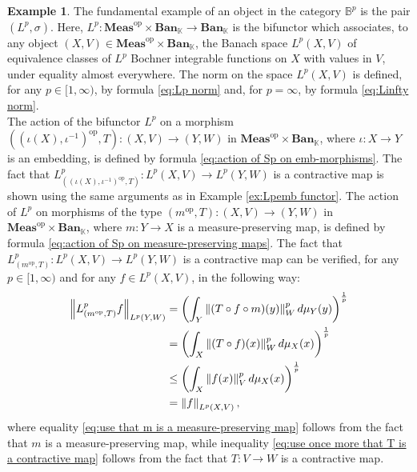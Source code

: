 \documentclass{amsart}
\theoremstyle{definition}
\newtheorem{example}[definition]{Example}
\theoremstyle{plain}
\newcommand{\norm}[1]{\left\lVert #1\right\rVert} %
\newcommand{\opMeas}{\mathbf{Meas}^\mathrm{op}}
\newcommand{\Ban}{\mathbf{Ban}_{\mathbb{K}}}
\newcommand{\Bp}{\mathbb{B}^p}
\begin{document}
        \begin{example}
        \label{ex:Lp functor}
            The fundamental example of an object in the category $\Bp$ is the pair $(L^p,\sigma)$.
            Here, $L^p \colon \opMeas \times \Ban \rightarrow \Ban$ is the bifunctor which associates, to any object $(X,V) \in \opMeas \times \Ban$, the Banach space $L^p(X,V)$ of equivalence classes of $L^p$ Bochner integrable functions on $X$ with values in $V$, under equality almost everywhere. 
            The norm on the space $L^p(X,V)$ is defined, for any $p \in [1,\infty)$, by formula \eqref{eq:Lp norm} and, for $p = \infty$, by formula \eqref{eq:Linfty norm}. \\
            The action of the bifunctor $L^p$ on a morphism $\left( \left( \iota(X),\iota^{-1} \right)^{\mathrm{op}},T \right) \colon (X,V) \rightarrow (Y,W)$ in $\opMeas \times \Ban$, where $\iota \colon X \rightarrow Y$ is an embedding, is defined by formula \eqref{eq:action of Sp on emb-morphisms}.
            The fact that $L^p_{\left( \left( \iota(X),\iota^{-1} \right)^{\mathrm{op}},T \right)} \colon L^p(X,V) \rightarrow L^p(Y,W)$ is a contractive map is shown using the same arguments as in Example \ref{ex:Lpemb functor}.
            The action of $L^p$ on morphisms of the type $\left( m^{\mathrm{op}},T \right) \colon (X,V) \rightarrow (Y,W)$ in $\opMeas \times \Ban$, where $m \colon Y \rightarrow X$ is a measure-preserving map, is defined by formula \eqref{eq:action of Sp on measure-preserving maps}.
            The fact that $L^p_{\left( m^{\mathrm{op}},T \right)} \colon L^p(X,V) \rightarrow L^p(Y,W)$ is a contractive map can be verified, for any $p \in [1,\infty)$ and for any $f \in L^p(X,V)$, in the following way:
            \begin{align}
                \norm{L^p_{\left( m^{\mathrm{op}},T \right)} f}_{L^p(Y,W)} &= \left( \int_{Y} \norm{(T \circ f \circ m)(y)}_W^p d\mu_{Y}(y) \right)^{\frac{1}{p}} \notag \\
                &= \left( \int_{X} \norm{(T \circ f)(x)}_W^p d\mu_{X}(x) \right)^{\frac{1}{p}} \label{eq:use that m is a measure-preserving map} \\
                &\leq \left( \int_{X} \norm{f(x)}_V^p d\mu_{X}(x) \right)^{\frac{1}{p}} \label{eq:use once more that T is a contractive map} \\
                &= \norm{f}_{L^p(X,V)}, \notag
            \end{align}
            where equality \eqref{eq:use that m is a measure-preserving map} follows from the fact that $m$ is a measure-preserving map, while inequality \eqref{eq:use once more that T is a contractive map} follows from the fact that $T \colon V \rightarrow W$ is a contractive map.

\end{example}
\end{document}
